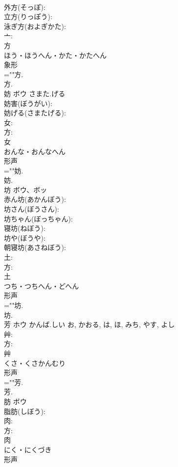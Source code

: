\documentclass[8pt]{extreport}
\begin{document}
\begin{CJK}{UTF8}{min}
\\	外方(そっぽ): 
\\	立方(りっぽう): 
\\	泳ぎ方(およぎかた): 
\\	亠: 
\\	方	
\\	ほう・ほうへん・かた・かたへん	
\\	象形 
\\	=""方.
\\	方.
\\	妨	ボウ	さまた.げる		
\\	妨害(ぼうがい): 
\\	妨げる(さまたげる): 
\\	女: 
\\	方: 
\\	女	
\\	おんな・おんなへん	
\\	形声 
\\	=""妨.
\\	妨.
\\	坊	ボウ、ボッ			
\\	赤ん坊(あかんぼう): 
\\	坊さん(ぼうさん): 
\\	坊ちゃん(ぼっちゃん): 
\\	寝坊(ねぼう): 
\\	坊や(ぼうや): 
\\	朝寝坊(あさねぼう): 
\\	土: 
\\	方: 
\\	土	
\\	つち・つちへん・どへん	
\\	形声 
\\	=""坊.
\\	坊.
\\	芳	ホウ	かんば.しい	お, かおる, は, ほ, みち, やす, よし	
\\	艸: 
\\	方: 
\\	艸	
\\	くさ・くさかんむり	
\\	形声 
\\	=""芳.
\\	芳.
\\	肪	ボウ			
\\	脂肪(しぼう): 
\\	肉: 
\\	方: 
\\	肉	
\\	にく・にくづき	
\\	形声 

\end{CJK}
\end{document}

